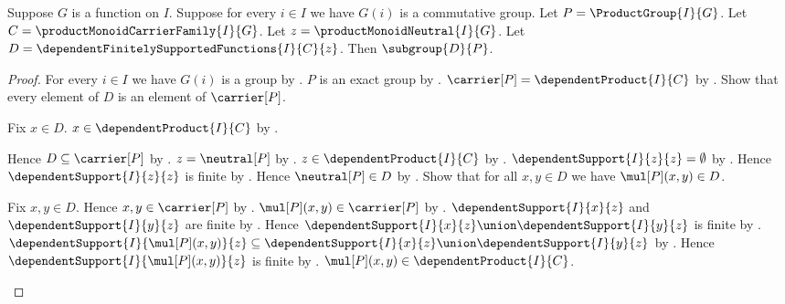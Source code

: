 \begin{theorem}\label{direct_sum_group_subgroup}
    Suppose $G$ is a function on $I$.
    Suppose for every $i\in I$ we have $G(i)$ is a commutative group.
    Let $P=\ProductGroup{I}{G}$.
    Let $C=\productMonoidCarrierFamily{I}{G}$.
    Let $z=\productMonoidNeutral{I}{G}$.
    Let $D=\dependentFinitelySupportedFunctions{I}{C}{z}$.
    Then $\subgroup{D}{P}$.
\end{theorem}
\begin{proof}
    For every $i\in I$ we have $G(i)$ is a group by
        .
    $P$ is an exact group by .
    $\carrier[P]=\dependentProduct{I}{C}$ by
        .
    Show that every element of $D$ is an element of $\carrier[P]$.
    \begin{subproof}
        Fix $x\in D$.
        $x\in\dependentProduct{I}{C}$ by
            .
    \end{subproof}
    Hence $D\subseteq\carrier[P]$ by .
    $z=\neutral[P]$ by
        .
    $z\in\dependentProduct{I}{C}$ by
        .
    $\dependentSupport{I}{z}{z}=\emptyset$ by
        .
    Hence $\dependentSupport{I}{z}{z}$ is finite by
        .
    Hence $\neutral[P]\in D$ by
        .
    Show that for all $x,y\in D$ we have $\mul[P](x,y)\in D$.
    \begin{subproof}
        Fix $x,y\in D$.
        Hence $x,y\in\carrier[P]$ by .
        $\mul[P](x,y)\in\carrier[P]$ by
            .
        $\dependentSupport{I}{x}{z}$ and
            $\dependentSupport{I}{y}{z}$ are finite by
            .
        Hence
            $\dependentSupport{I}{x}{z}\union
                \dependentSupport{I}{y}{z}$ is finite by
            .
        $\dependentSupport{I}{\mul[P](x,y)}{z}\subseteq
            \dependentSupport{I}{x}{z}\union
                \dependentSupport{I}{y}{z}$ by
            .
        Hence $\dependentSupport{I}{\mul[P](x,y)}{z}$ is finite by
            .
        $\mul[P](x,y)\in\dependentProduct{I}{C}$.

\end{subproof}
\end{proof}
